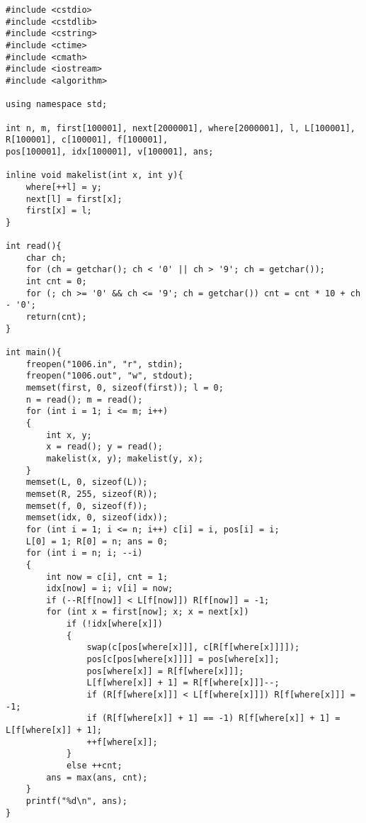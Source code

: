 \begin{lstlisting}
#include <cstdio>
#include <cstdlib>
#include <cstring>
#include <ctime>
#include <cmath>
#include <iostream>
#include <algorithm>

using namespace std;

int n, m, first[100001], next[2000001], where[2000001], l, L[100001], R[100001], c[100001], f[100001],
pos[100001], idx[100001], v[100001], ans;

inline void makelist(int x, int y){
    where[++l] = y;
    next[l] = first[x];
    first[x] = l;
}

int read(){
    char ch;
    for (ch = getchar(); ch < '0' || ch > '9'; ch = getchar());
    int cnt = 0;
    for (; ch >= '0' && ch <= '9'; ch = getchar()) cnt = cnt * 10 + ch - '0';
    return(cnt);
}

int main(){
    freopen("1006.in", "r", stdin);
    freopen("1006.out", "w", stdout);
    memset(first, 0, sizeof(first)); l = 0;
    n = read(); m = read();
    for (int i = 1; i <= m; i++)
    {
        int x, y;
        x = read(); y = read();
        makelist(x, y); makelist(y, x);
    }
    memset(L, 0, sizeof(L));
    memset(R, 255, sizeof(R));
    memset(f, 0, sizeof(f));
    memset(idx, 0, sizeof(idx));
    for (int i = 1; i <= n; i++) c[i] = i, pos[i] = i;
    L[0] = 1; R[0] = n; ans = 0;
    for (int i = n; i; --i)
    {
        int now = c[i], cnt = 1;
        idx[now] = i; v[i] = now;
        if (--R[f[now]] < L[f[now]]) R[f[now]] = -1;
        for (int x = first[now]; x; x = next[x])
            if (!idx[where[x]])
            {
                swap(c[pos[where[x]]], c[R[f[where[x]]]]);
                pos[c[pos[where[x]]]] = pos[where[x]];
                pos[where[x]] = R[f[where[x]]];
                L[f[where[x]] + 1] = R[f[where[x]]]--;
                if (R[f[where[x]]] < L[f[where[x]]]) R[f[where[x]]] = -1;
                if (R[f[where[x]] + 1] == -1) R[f[where[x]] + 1] = L[f[where[x]] + 1];
                ++f[where[x]];
            }
            else ++cnt;
        ans = max(ans, cnt);
    }
    printf("%d\n", ans);
}
\end{lstlisting}
